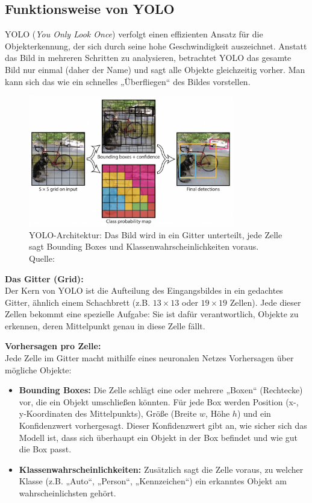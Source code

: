 \subsection{Funktionsweise von YOLO}

YOLO (\textit{You Only Look Once}) verfolgt einen effizienten Ansatz für die Objekterkennung, der sich durch seine hohe Geschwindigkeit auszeichnet. Anstatt das Bild in mehreren Schritten zu analysieren, betrachtet YOLO das gesamte Bild nur einmal (daher der Name) und sagt alle Objekte gleichzeitig vorher. Man kann sich das wie ein schnelles „Überfliegen“ des Bildes vorstellen.

\begin{figure}[htbp]
    \centering
    \includegraphics[width=0.8\textwidth]{data/yolo_grid.png}
    \caption{YOLO-Architektur: Das Bild wird in ein Gitter unterteilt, jede Zelle sagt Bounding Boxes und Klassenwahrscheinlichkeiten voraus. Quelle: \cite{yolo_grid}}
    \label{fig:yolo_grid}
\end{figure}

\textbf{Das Gitter (Grid):} \\
Der Kern von YOLO ist die Aufteilung des Eingangsbildes in ein gedachtes Gitter, ähnlich einem Schachbrett (z.B. $13 \times 13$ oder $19 \times 19$ Zellen). Jede dieser Zellen bekommt eine spezielle Aufgabe: Sie ist dafür verantwortlich, Objekte zu erkennen, deren Mittelpunkt genau in diese Zelle fällt.

\textbf{Vorhersagen pro Zelle:} \\
Jede Zelle im Gitter macht mithilfe eines neuronalen Netzes Vorhersagen über mögliche Objekte:
\begin{itemize}
    \item \textbf{Bounding Boxes:} Die Zelle schlägt eine oder mehrere „Boxen“ (Rechtecke) vor, die ein Objekt umschließen könnten. Für jede Box werden Position (x-, y-Koordinaten des Mittelpunkts), Größe (Breite $w$, Höhe $h$) und ein Konfidenzwert vorhergesagt. Dieser Konfidenzwert gibt an, wie sicher sich das Modell ist, dass sich überhaupt ein Objekt in der Box befindet und wie gut die Box passt.
    \item \textbf{Klassenwahrscheinlichkeiten:} Zusätzlich sagt die Zelle voraus, zu welcher Klasse (z.B. „Auto“, „Person“, „Kennzeichen“) ein erkanntes Objekt am wahrscheinlichsten gehört.
\end{itemize}


